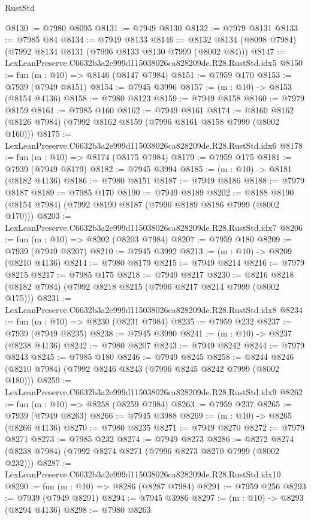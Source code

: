 \begin{lexlean}{RustStd}
\begin{coremodule}
@8130 := @7980 @8095
@8131 := @7949 @8130
@8132 := @7979 @8131
@8133 := @7985 @84
@8134 := @7949 @8133
@8146 := @8132 @8134 (@8098 @7984) (@7992 @8134 @8131 (@7996 @8133 @8130 @7999 (@8002 @84)))
@8147 := LexLeanPreserve.C6632b3a2e999d115038026ca828209de.R28.RustStd.idx5
@8150 := fun (m : @10) => @8146 (@8147 @7984)
@8151 := @7959 @170
@8153 := @7939 (@7949 @8151)
@8154 := @7945 @3996
@8157 := (m : @10) -> @8153 (@8154 @4136)
@8158 := @7980 @8123
@8159 := @7949 @8158
@8160 := @7979 @8159
@8161 := @7985 @160
@8162 := @7949 @8161
@8174 := @8160 @8162 (@8126 @7984) (@7992 @8162 @8159 (@7996 @8161 @8158 @7999 (@8002 @160)))
@8175 := LexLeanPreserve.C6632b3a2e999d115038026ca828209de.R28.RustStd.idx6
@8178 := fun (m : @10) => @8174 (@8175 @7984)
@8179 := @7959 @175
@8181 := @7939 (@7949 @8179)
@8182 := @7945 @3994
@8185 := (m : @10) -> @8181 (@8182 @4136)
@8186 := @7980 @8151
@8187 := @7949 @8186
@8188 := @7979 @8187
@8189 := @7985 @170
@8190 := @7949 @8189
@8202 := @8188 @8190 (@8154 @7984) (@7992 @8190 @8187 (@7996 @8189 @8186 @7999 (@8002 @170)))
@8203 := LexLeanPreserve.C6632b3a2e999d115038026ca828209de.R28.RustStd.idx7
@8206 := fun (m : @10) => @8202 (@8203 @7984)
@8207 := @7959 @180
@8209 := @7939 (@7949 @8207)
@8210 := @7945 @3992
@8213 := (m : @10) -> @8209 (@8210 @4136)
@8214 := @7980 @8179
@8215 := @7949 @8214
@8216 := @7979 @8215
@8217 := @7985 @175
@8218 := @7949 @8217
@8230 := @8216 @8218 (@8182 @7984) (@7992 @8218 @8215 (@7996 @8217 @8214 @7999 (@8002 @175)))
@8231 := LexLeanPreserve.C6632b3a2e999d115038026ca828209de.R28.RustStd.idx8
@8234 := fun (m : @10) => @8230 (@8231 @7984)
@8235 := @7959 @232
@8237 := @7939 (@7949 @8235)
@8238 := @7945 @3990
@8241 := (m : @10) -> @8237 (@8238 @4136)
@8242 := @7980 @8207
@8243 := @7949 @8242
@8244 := @7979 @8243
@8245 := @7985 @180
@8246 := @7949 @8245
@8258 := @8244 @8246 (@8210 @7984) (@7992 @8246 @8243 (@7996 @8245 @8242 @7999 (@8002 @180)))
@8259 := LexLeanPreserve.C6632b3a2e999d115038026ca828209de.R28.RustStd.idx9
@8262 := fun (m : @10) => @8258 (@8259 @7984)
@8263 := @7959 @237
@8265 := @7939 (@7949 @8263)
@8266 := @7945 @3988
@8269 := (m : @10) -> @8265 (@8266 @4136)
@8270 := @7980 @8235
@8271 := @7949 @8270
@8272 := @7979 @8271
@8273 := @7985 @232
@8274 := @7949 @8273
@8286 := @8272 @8274 (@8238 @7984) (@7992 @8274 @8271 (@7996 @8273 @8270 @7999 (@8002 @232)))
@8287 := LexLeanPreserve.C6632b3a2e999d115038026ca828209de.R28.RustStd.idx10
@8290 := fun (m : @10) => @8286 (@8287 @7984)
@8291 := @7959 @256
@8293 := @7939 (@7949 @8291)
@8294 := @7945 @3986
@8297 := (m : @10) -> @8293 (@8294 @4136)
@8298 := @7980 @8263

\end{coremodule}
\end{lexlean}
